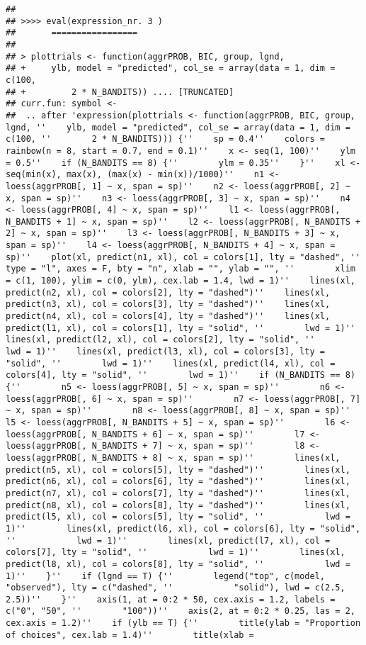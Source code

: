 \documentclass[11pt,,]{article}
\begin{document}
\begin{verbatim}
## 
## >>>> eval(expression_nr. 3 )
##       =================
## 
## > plottrials <- function(aggrPROB, BIC, group, lgnd, 
## +     ylb, model = "predicted", col_se = array(data = 1, dim = c(100, 
## +         2 * N_BANDITS)) .... [TRUNCATED] 
## curr.fun: symbol <-
##  .. after 'expression(plottrials <- function(aggrPROB, BIC, group, lgnd, ''    ylb, model = "predicted", col_se = array(data = 1, dim = c(100, ''        2 * N_BANDITS))) {''    sp = 0.4''    colors = rainbow(n = 8, start = 0.7, end = 0.1)''    x <- seq(1, 100)''    ylm = 0.5''    if (N_BANDITS == 8) {''        ylm = 0.35''    }''    xl <- seq(min(x), max(x), (max(x) - min(x))/1000)''    n1 <- loess(aggrPROB[, 1] ~ x, span = sp)''    n2 <- loess(aggrPROB[, 2] ~ x, span = sp)''    n3 <- loess(aggrPROB[, 3] ~ x, span = sp)''    n4 <- loess(aggrPROB[, 4] ~ x, span = sp)''    l1 <- loess(aggrPROB[, N_BANDITS + 1] ~ x, span = sp)''    l2 <- loess(aggrPROB[, N_BANDITS + 2] ~ x, span = sp)''    l3 <- loess(aggrPROB[, N_BANDITS + 3] ~ x, span = sp)''    l4 <- loess(aggrPROB[, N_BANDITS + 4] ~ x, span = sp)''    plot(xl, predict(n1, xl), col = colors[1], lty = "dashed", ''        type = "l", axes = F, bty = "n", xlab = "", ylab = "", ''        xlim = c(1, 100), ylim = c(0, ylm), cex.lab = 1.4, lwd = 1)''    lines(xl, predict(n2, xl), col = colors[2], lty = "dashed")''    lines(xl, predict(n3, xl), col = colors[3], lty = "dashed")''    lines(xl, predict(n4, xl), col = colors[4], lty = "dashed")''    lines(xl, predict(l1, xl), col = colors[1], lty = "solid", ''        lwd = 1)''    lines(xl, predict(l2, xl), col = colors[2], lty = "solid", ''        lwd = 1)''    lines(xl, predict(l3, xl), col = colors[3], lty = "solid", ''        lwd = 1)''    lines(xl, predict(l4, xl), col = colors[4], lty = "solid", ''        lwd = 1)''    if (N_BANDITS == 8) {''        n5 <- loess(aggrPROB[, 5] ~ x, span = sp)''        n6 <- loess(aggrPROB[, 6] ~ x, span = sp)''        n7 <- loess(aggrPROB[, 7] ~ x, span = sp)''        n8 <- loess(aggrPROB[, 8] ~ x, span = sp)''        l5 <- loess(aggrPROB[, N_BANDITS + 5] ~ x, span = sp)''        l6 <- loess(aggrPROB[, N_BANDITS + 6] ~ x, span = sp)''        l7 <- loess(aggrPROB[, N_BANDITS + 7] ~ x, span = sp)''        l8 <- loess(aggrPROB[, N_BANDITS + 8] ~ x, span = sp)''        lines(xl, predict(n5, xl), col = colors[5], lty = "dashed")''        lines(xl, predict(n6, xl), col = colors[6], lty = "dashed")''        lines(xl, predict(n7, xl), col = colors[7], lty = "dashed")''        lines(xl, predict(n8, xl), col = colors[8], lty = "dashed")''        lines(xl, predict(l5, xl), col = colors[5], lty = "solid", ''            lwd = 1)''        lines(xl, predict(l6, xl), col = colors[6], lty = "solid", ''            lwd = 1)''        lines(xl, predict(l7, xl), col = colors[7], lty = "solid", ''            lwd = 1)''        lines(xl, predict(l8, xl), col = colors[8], lty = "solid", ''            lwd = 1)''    }''    if (lgnd == T) {''        legend("top", c(model, "observed"), lty = c("dashed", ''            "solid"), lwd = c(2.5, 2.5))''    }''    axis(1, at = 0:2 * 50, cex.axis = 1.2, labels = c("0", "50", ''        "100"))''    axis(2, at = 0:2 * 0.25, las = 2, cex.axis = 1.2)''    if (ylb == T) {''        title(ylab = "Proportion of choices", cex.lab = 1.4)''        title(xlab = 
\end{verbatim}
\end{document}
